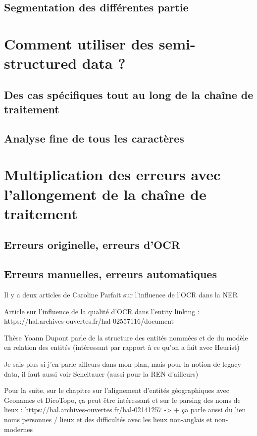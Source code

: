 \documentclass[a4paper,12pt,twoside]{book}
\begin{document}
	\subsection{Segmentation des différentes partie}
	
	\section{Comment utiliser des semi-structured data ?}
	
	\subsection{Des cas spécifiques tout au long de la chaîne de traitement}
	
	\subsection{Analyse fine de tous les caractères}
	
	\section{Multiplication des erreurs avec l’allongement de la chaîne de traitement}
	
	\subsection{Erreurs originelle, erreurs d’OCR}
	
	\subsection{Erreurs manuelles, erreurs automatiques}
	
	
		Il y a deux articles de Caroline Parfait sur l'influence de l'OCR dans la NER
	
	Article sur l'influence de la qualité d'OCR dans l'entity linking : 
	https://hal.archives-ouvertes.fr/hal-02557116/document
	
	Thèse Yoann Dupont parle de la structure des entités nommées et de du modèle en relation des entités (intéressant par rapport à ce qu'on a fait avec Heurist)
	
	Je sais plus si j'en parle ailleurs dans mon plan, mais pour la notion de legacy data, il faut aussi voir Scheitauer (aussi pour la REN d'ailleurs)
	
	Pour la suite, sur le chapitre sur l'alignement d'entités géographiques avec Geonames et DicoTopo, ça peut être intéressant et sur le parsing des noms de lieux : https://hal.archives-ouvertes.fr/hal-02141257
	-> + ça parle aussi du lien noms personnes / lieux et des difficultés avec les lieux non-anglais et non-modernes
	
\end{document}
